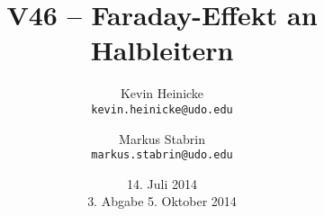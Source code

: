 



\title{%
    V46 -- Faraday-Effekt an Halbleitern
}
\author{%
    Kevin Heinicke\\
    \texttt{kevin.heinicke@udo.edu}
    \and
    Markus Stabrin\\
    \texttt{markus.stabrin@udo.edu}
}
\date{%
    14. Juli 2014\\
    {\small 3. Abgabe} 5. Oktober 2014
}

    \maketitle%
    \tableofcontents
    \newpage

    
    
    \printbibliography

